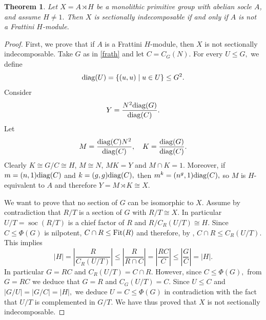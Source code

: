 \documentclass[a4paper,10pt]{amsart}
\theoremstyle{plain}
\newtheorem{thm}{Theorem}[section]
\theoremstyle{definition}
\DeclareMathOperator{\soc}{soc}
\begin{document}
\begin{thm}\label{t:char-frath}
    Let $X=A\rtimes H$ be a monolithic primitive group with abelian socle $A$, and assume $H\neq 1.$ Then $X$ is sectionally indecomposable if and only if $A$ is not a Frattini $H$-module.
\end{thm}
\begin{proof}
First, we prove that if $A$ is a Frattini $H$-module, then $X$ is not sectionally indecomposable. Take $G$ as in \cref{frath} and let $C=C_G(N)$. For every $U\leq G,$
we define $${\rm{diag}}(U)=\{(u,u)\mid u\in U\}\leq G^2.$$
Consider $$Y=\frac{N^2 {\rm{diag}}(G)}{{\rm{diag}}(C)}.$$
Let $$M=\frac{{\rm{diag}}(C)N^2}{{\rm{diag}}(C)},\quad K=\frac{{\rm{diag}}(G)}{{\rm{diag}}(C)}.$$ Clearly $K\cong G/C \cong H$, $M\cong N$, $MK=Y$
and $M\cap K=1.$ Moreover, if $m=(n,1){\rm{diag}}(C)$ and $k=(g,g){\rm{diag}}(C),$ then $m^k=(n^g,1){\rm{diag}}(C),$ so $M$ is $H$-equivalent to $A$
and therefore $Y=M\rtimes K \cong X.$ 

We want to prove that no section of $G$ can be isomorphic to $X$. Assume by contradiction that $R/T$ is a section of $G$ with $R/T\cong X$. In particular  $U/T=\soc(R/T)$ is a chief factor of $R$ and  $R/C_R(U/T)\cong H.$ Since $C\leq \Phi(G)$ is nilpotent,
$C\cap R\leq {\rm{Fit}}(R)$ and therefore, by \cite[5.2.9]{rob},
$C\cap R\leq C_R(U/T).$
This implies
$$|H|=\left|\frac{R}{C_R(U/T)}\right|\leq \left|\frac{R}{R\cap C}\right|=\left|\frac{RC}{C}\right|\leq \left|\frac{G}{C}\right|=|H|.$$
In particular $G=RC$ and $C_R(U/T)=C\cap R$. However, since $C\leq \Phi(G),$ from $G=RC$ we deduce that $G=R$ and $C_G(U/T)=C.$ Since $U\leq C$ and $|G/U|=|G/C|=|H|,$ we deduce $U=C\leq \Phi(G)$ in contradiction with the fact that $U/T$ is complemented in $G/T.$ We have thus proved that $X$ is not sectionally indecomposable.


\end{proof}
\end{document}
